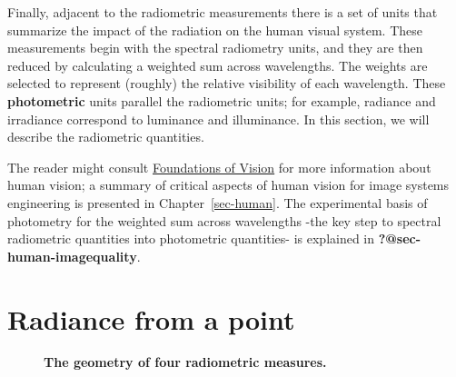 \documentclass[
  letterpaper,
]{book}
\begin{document}
Finally, adjacent to the radiometric measurements there is a set of
units that summarize the impact of the radiation on the human visual
system. These measurements begin with the spectral radiometry units, and
they are then reduced by calculating a weighted sum across wavelengths.
The weights are selected to represent (roughly) the relative visibility
of each wavelength. These \textbf{photometric} units parallel the
radiometric units; for example, radiance and irradiance correspond to
luminance and illuminance. In this section, we will describe the
radiometric quantities.

The reader might consult
\href{https://wandell.github.io/FOV-1995}{Foundations of Vision} for
more information about human vision; a summary of critical aspects of
human vision for image systems engineering is presented in
Chapter~\ref{sec-human}. The experimental basis of photometry for the
weighted sum across wavelengths -the key step to spectral radiometric
quantities into photometric quantities- is explained in
\textbf{?@sec-human-imagequality}.

\section{Radiance from a point}\label{radiance-from-a-point}

\begin{figure}


\caption{\label{fig-radiometry}\textbf{The geometry of four radiometric
measures.}}

\end{figure}%
\end{document}
